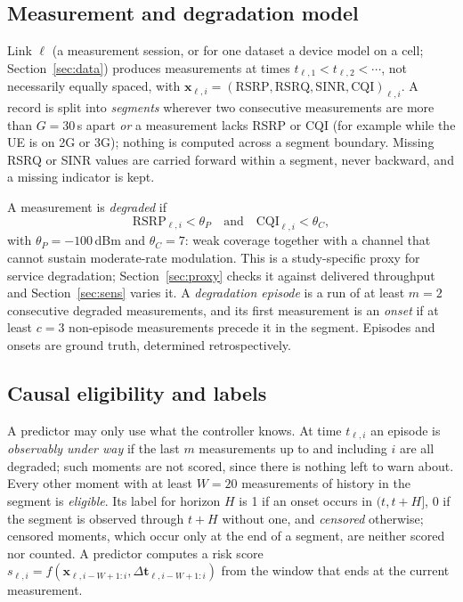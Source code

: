 \documentclass[preprint,review,12pt]{elsarticle}
\begin{document}
\subsection{Measurement and degradation model}
Link $\ell$ (a measurement session, or for one dataset a device model on a cell;
Section~\ref{sec:data}) produces measurements at times $t_{\ell,1}<t_{\ell,2}<\cdots$,
not necessarily equally spaced, with
$\mathbf{x}_{\ell,i}=(\mathrm{RSRP},\mathrm{RSRQ},\mathrm{SINR},\mathrm{CQI})_{\ell,i}$.
A record is split into \emph{segments} wherever two consecutive measurements are
more than $G=30$\,s apart \emph{or} a measurement lacks RSRP or CQI (for example while
the UE is on 2G or 3G); nothing is computed across a segment boundary. Missing RSRQ
or SINR values are carried forward within a segment, never backward, and a missing
indicator is kept.

A measurement is \emph{degraded} if
\begin{equation}
\mathrm{RSRP}_{\ell,i}<\theta_P \quad\text{and}\quad \mathrm{CQI}_{\ell,i}<\theta_C,
\label{eq:degraded}
\end{equation}
with $\theta_P=-100$\,dBm and $\theta_C=7$: weak coverage together with a channel
that cannot sustain moderate-rate modulation. This is a study-specific proxy for
service degradation; Section~\ref{sec:proxy} checks it against delivered
throughput and Section~\ref{sec:sens} varies it. A \emph{degradation episode} is a
run of at least $m=2$ consecutive degraded measurements, and its first measurement
is an \emph{onset} if at least $c=3$ non-episode measurements precede it in the
segment. Episodes and onsets are ground truth, determined retrospectively.

\subsection{Causal eligibility and labels}
A predictor may only use what the controller knows. At time $t_{\ell,i}$ an episode
is \emph{observably under way} if the last $m$ measurements up to and including $i$
are all degraded; such moments are not scored, since there is nothing left to warn
about. Every other moment with at least $W=20$ measurements of history in the
segment is \emph{eligible}. Its label for horizon $H$ is 1 if an onset occurs in
$(t,t+H]$, 0 if the segment is observed through $t+H$ without one, and
\emph{censored} otherwise; censored moments, which occur only at the end of a
segment, are neither scored nor counted. A predictor computes a risk score
$s_{\ell,i}=f(\mathbf{x}_{\ell,i-W+1:i},\Delta\mathbf{t}_{\ell,i-W+1:i})$ from the
window that ends at the current measurement.
\end{document}
